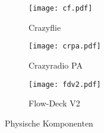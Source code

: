 \begin{figure}[H]
    \centering
    \begin{imgbox}
        \begin{subfigure}[b]{0.3\textwidth}
            \centering
            \texttt{[image: cf.pdf]}
            \caption{Crazyflie  \cite{bc:cf20}}
            \label{pic:cf20}
        \end{subfigure}
        \hfill
        \begin{subfigure}[b]{0.3\textwidth}
            \centering
            \texttt{[image: crpa.pdf]}
            \caption{Crazyradio PA \cite{bc:crpa}}
            \label{pic:crpa}
        \end{subfigure}
        \hfill
        \begin{subfigure}[b]{0.3\textwidth}
            \centering
            \texttt{[image: fdv2.pdf]}
            \caption{Flow-Deck V2 \cite{bc:fdv2}}
            \label{pic:fdv2}
        \end{subfigure}
    \end{imgbox}
    \caption{Physische Komponenten}
        \label{fig:drohne_und_radio}
\end{figure}

\endgroup